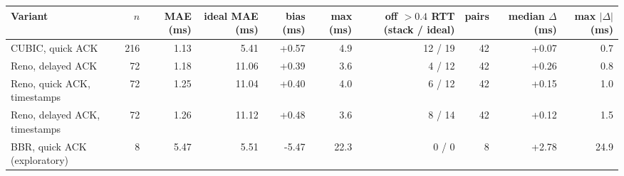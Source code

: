 \begin{tabular}{@{}lrrrrrrrrr@{}}
\toprule
Variant & $n$ & MAE (ms) & ideal MAE (ms) & bias (ms) & max (ms) & off $>0.4$ RTT (stack / ideal) & pairs & median $\Delta$ (ms) & max $|\Delta|$ (ms) \\
\midrule
CUBIC, quick ACK & 216 & 1.13 & 5.41 & +0.57 & 4.9 & 12 / 19 & 42 & +0.07 & 0.7 \\
Reno, delayed ACK & 72 & 1.18 & 11.06 & +0.39 & 3.6 & 4 / 12 & 42 & +0.26 & 0.8 \\
Reno, quick ACK, timestamps & 72 & 1.25 & 11.04 & +0.40 & 4.0 & 6 / 12 & 42 & +0.15 & 1.0 \\
Reno, delayed ACK, timestamps & 72 & 1.26 & 11.12 & +0.48 & 3.6 & 8 / 14 & 42 & +0.12 & 1.5 \\
BBR, quick ACK (exploratory) & 8 & 5.47 & 5.51 & -5.47 & 22.3 & 0 / 0 & 8 & +2.78 & 24.9 \\
\bottomrule
\end{tabular}

